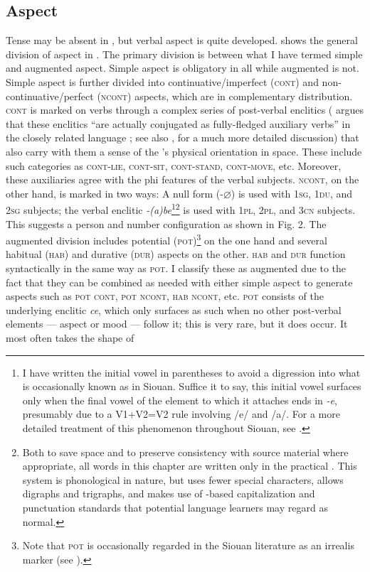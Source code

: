 \documentclass[output=paper]{LSP/langsci}
\begin{document}
\subsection{Aspect}
Tense may be absent in , but verbal aspect is quite developed.  shows the general division of aspect in . The primary division is between what I have termed simple and augmented aspect. Simple aspect is obligatory in all  while augmented is not. Simple aspect is further divided into continuative/imperfect (\textsc{cont}) and non-continuative/perfect (\textsc{ncont}) aspects, which are in complementary distribution. \textsc{cont} is marked on verbs through a complex series of post-verbal enclitics (\citet[485]{Rankin2005b} argues that these enclitics ``are actually conjugated as fully-fledged auxiliary verbs'' in the closely related  language ; see also \citet{Rankin2004positionals}, for a much more detailed discussion) that also carry with them a sense of the 's physical orientation in space. These include such categories as \textsc{cont-lie}, \textsc{cont-sit}, \textsc{cont-stand}, \textsc{cont-move}, etc. Moreover, these auxiliaries agree with the phi features of the verbal subjects. \textsc{ncont}, on the other hand, is marked in two ways: A null form (-$\varnothing$) is used with \textsc{1sg, 1du}, and \textsc{2sg} subjects; the verbal enclitic \textit{-(a)be}\footnote{I have written the initial vowel in parentheses to avoid a digression into what is occasionally known as  in Siouan. Suffice it to say, this initial vowel surfaces only when the final vowel of the element to which it attaches ends in \textit{-e}, presumably due to a V1+V2=V2 rule involving  /e/ and /a/. For a more detailed treatment of this phenomenon throughout Siouan, see \citet{Rankin1995}.}\footnote{Both to save space and to preserve consistency with source material where appropriate, all  words in this chapter are written only in the practical . This system is phonological in nature, but uses fewer special characters, allows digraphs and trigraphs, and makes use of -based capitalization and punctuation standards that potential language learners may regard as normal.} is used with \textsc{1pl, 2pl}, and \textsc{3cn} subjects. This suggests a person and number configuration as shown in Fig. 2. The augmented division includes potential (\textsc{pot})\footnote{Note that \textsc{pot} is occasionally regarded in the Siouan literature as an irrealis marker (see \citealt{Quintero2004,Quintero2009}).} on the one hand and several habitual (\textsc{hab}) and durative (\textsc{dur}) aspects on the other. \textsc{hab} and \textsc{dur} function syntactically in the same way as \textsc{pot}. I classify these as augmented due to the fact that they can be combined as needed with either simple aspect to generate  aspects such as \textsc{pot cont}, \textsc{pot ncont}, \textsc{hab ncont}, etc. \textsc{pot} consists of the underlying enclitic \textit{ce}, which only surfaces as such when no other post-verbal elements --- aspect or mood --- follow it; this is very rare, but it does occur. It most often takes the shape of 
\end{document}
